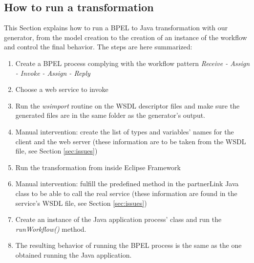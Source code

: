 \subsection{How to run a transformation}
\label{sec:HowToRun}
This Section explains how to run a BPEL to Java transformation with our generator, from the model creation to the creation of an instance of the workflow and control the final behavior.
The steps are here summarized:
\begin{enumerate}
 \item Create a BPEL process complying with the workflow pattern \textit{Receive - Assign - Invoke - Assign - Reply}
 \item Choose a web service to invoke
 \item Run the \textit{wsimport} routine on the WSDL descriptor files and make sure the generated files are in the same folder as the generator's output.
 \item Manual intervention: create the list of types and variables' names for the client and the web server (these information are to be taken from the WSDL file, see Section \ref{sec:issues})
 \item Run the transformation from inside Eclipse Framework
 \item Manual intervention: fulfill the predefined method in the partnerLink Java class to be able to call the real service (these information are found in the service's WSDL file, see Section \ref{sec:issues})
 \item Create an instance of the Java application process' class and run the \textit{runWorkflow()} method.
 \item The resulting behavior of running the BPEL process is the same as the one obtained running the Java application.
\end{enumerate}







